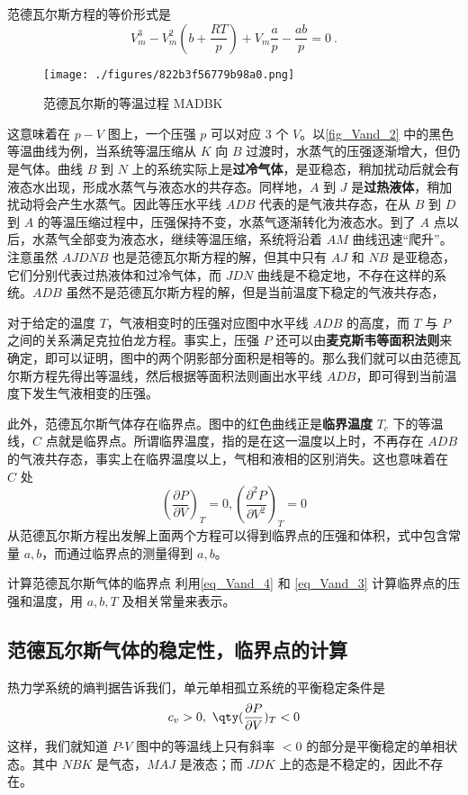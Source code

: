 范德瓦尔斯方程的等价形式是
\begin{equation}\label{eq_Vand_4}
V_m^3-V_m^2(b+\frac{RT}{p})+V_m\frac{a}{p}-\frac{ab}{p}=0~.
\end{equation}

\begin{figure}[ht]
\centering
\texttt{[image: ./figures/822b3f56779b98a0.png]}
\caption{范德瓦尔斯的等温过程 MADBK} \label{fig_Vand_2}
\end{figure}


这意味着在 $p-V$ 图上，一个压强 $p$ 可以对应 $3$ 个 $V$。以\autoref{fig_Vand_2} 中的黑色等温曲线为例，当系统等温压缩从 $K$ 向 $B$ 过渡时，水蒸气的压强逐渐增大，但仍是气体。曲线 $B$ 到 $N$ 上的系统实际上是\textbf{过冷气体}，是亚稳态，稍加扰动后就会有液态水出现，形成水蒸气与液态水的共存态。同样地，$A$ 到 $J$ 是\textbf{过热液体}，稍加扰动将会产生水蒸气。因此等压水平线 $ADB$ 代表的是气液共存态，在从 $B$ 到 $D$ 到 $A$ 的等温压缩过程中，压强保持不变，水蒸气逐渐转化为液态水。到了 $A$ 点以后，水蒸气全部变为液态水，继续等温压缩，系统将沿着 $AM$ 曲线迅速“爬升”。注意虽然 $AJDNB$ 也是范德瓦尔斯方程的解，但其中只有 $AJ$ 和 $NB$ 是亚稳态，它们分别代表过热液体和过冷气体，而 $JDN$ 曲线是不稳定地，不存在这样的系统。$ADB$ 虽然不是范德瓦尔斯方程的解，但是当前温度下稳定的气液共存态，

对于给定的温度 $T$，气液相变时的压强对应图中水平线 $ADB$ 的高度，而 $T$ 与 $P$ 之间的关系满足克拉伯龙方程。事实上，压强 $P$ 还可以由\textbf{麦克斯韦等面积法则}来确定，即可以证明，图中的两个阴影部分面积是相等的。那么我们就可以由范德瓦尔斯方程先得出等温线，然后根据等面积法则画出水平线 $ADB$，即可得到当前温度下发生气液相变的压强。

此外，范德瓦尔斯气体存在临界点。图中的红色曲线正是\textbf{临界温度} $T_c$ 下的等温线，$C$ 点就是临界点。所谓临界温度，指的是在这一温度以上时，不再存在 $ADB$ 的气液共存态，事实上在临界温度以上，气相和液相的区别消失。这也意味着在 $C$ 处
\begin{equation}\label{eq_Vand_3}
\left(\frac{\partial P}{\partial V}\right)_T=0,
\left(\frac{\partial^2 P}{\partial V^2}\right)_T=0
\end{equation}
从范德瓦尔斯方程出发解上面两个方程可以得到临界点的压强和体积，式中包含常量 $a,b$，而通过临界点的测量得到 $a,b$。
\begin{exercise}{计算范德瓦尔斯气体的临界点}
利用\autoref{eq_Vand_4} 和 \autoref{eq_Vand_3} 计算临界点的压强和温度，用 $a,b,T$ 及相关常量来表示。
\end{exercise}
\subsection{范德瓦尔斯气体的稳定性，临界点的计算}
热力学系统的熵判据告诉我们，单元单相孤立系统的平衡稳定条件是
\begin{equation}\label{eq_Vand_1}
c_v>0,\ \qty(\frac{\partial P}{\partial V})_T<0
\end{equation}
这样，我们就知道 $P$-$V$ 图中的等温线上只有斜率 $<0$ 的部分是平衡稳定的单相状态。其中 $NBK$ 是气态，$MAJ$ 是液态；而 $JDK$ 上的态是不稳定的，因此不存在。

